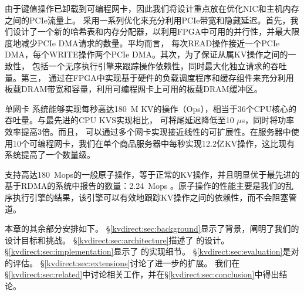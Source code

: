 由于键值操作已卸载到可编程网卡，因此我们将设计重点放在优化NIC和主机内存之间的PCIe流量上。 \oursys{} 采用一系列优化来充分利用PCIe带宽和隐藏延迟。首先，我们设计了一个新的哈希表和内存分配器，以利用FPGA中可用的并行性，并最大限度地减少PCIe DMA请求的数量。平均而言，\oursys{} 每次READ操作接近一个PCIe DMA，每个WRITE操作两个PCIe DMA。其次，为了保证从属KV操作之间的一致性，\oursys{} 包括一个无序执行引擎来跟踪操作依赖性，同时最大化独立请求的吞吐量。第三，\oursys{} 通过在FPGA中实现基于硬件的负载调度程序和缓存组件来充分利用板载DRAM带宽和容量，利用可编程网卡上可用的板载DRAM缓冲区。

单网卡 \oursys{} 系统能够实现每秒高达180~M KV的操作（Ops），相当于36个CPU核心的吞吐量\cite {li2016full}。与最先进的CPU KVS实现相比，\oursys{} 可将尾延迟降低至10 $\mu$s，同时将功率效率提高3倍。而且，\oursys{} 可以通过多个网卡实现接近线性的可扩展性。在服务器中使用10个可编程网卡，我们在单个商品服务器中每秒实现12.2亿KV操作，这比现有系统提高了一个数量级。

\oursys{} 支持高达180~Mops的一般原子操作，等于正常的KV操作，并且明显优于最先进的基于RDMA的系统中报告的数量：2.24~Mops \cite {kalia2014using}。原子操作的性能主要是我们的乱序执行引擎的结果，该引擎可以有效地跟踪KV操作之间的依赖性，而不会阻塞管道。

本章的其余部分安排如下。 \S \ref {kvdirect:sec:background}显示了背景，阐明了我们的设计目标和挑战。 \S \ref {kvdirect:sec:architecture}描述了\oursys{} 的设计。 \S \ref {kvdirect:sec:implementation}显示了\oursys{} 的实现细节。 \S \ref {kvdirect:sec:evaluation}是对\oursys{} 的评估。 \S \ref {kvdirect:sec:extensions}讨论了进一步的扩展。 我们在\S \ref {kvdirect:sec:related}中讨论相关工作，并在\S \ref {kvdirect:sec:conclusion}中得出结论。
